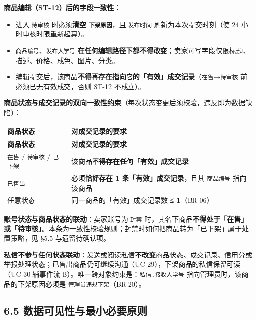 \documentclass[12pt,a4paper]{ctexart}
\begin{document}
\textbf{商品编辑（ST-12）后的字段一致性}：

\begin{itemize}[leftmargin=1.6em,itemsep=1pt,topsep=2pt]
\item 进入 \texttt{待审核} 时必须\textbf{清空 \texttt{下架原因}}，且 \texttt{发布时间} 刷新为本次提交时刻（使 24 小时审核时限重新起算）。
\item \texttt{商品编号}、\texttt{发布人学号} \textbf{在任何编辑路径下都不得改变}；卖家可写字段仅限标题、描述、价格、成色、图片、分类。
\item 编辑提交后，该商品\textbf{不得再存在指向它的「有效」成交记录}（\texttt{在售}→\texttt{待审核} 前必须已无有效成交，否则 ST-12 不成立）。
\end{itemize}

\textbf{商品状态与成交记录的双向一致性约束}（每次状态变更后须校验，违反即为数据缺陷）：


{\footnotesize
\begin{longtable}{|p{2.75cm}|p{13.25cm}|}
\hline
\textbf{商品状态} & \textbf{对成交记录的要求} \\
\hline
\endfirsthead
\hline
\textbf{商品状态} & \textbf{对成交记录的要求} \\
\hline
\endhead
\hline
\endfoot
\texttt{在售} / \texttt{待审核} / \texttt{已下架} & 该商品\textbf{不得存在任何「有效」成交记录} \\
\hline
\texttt{已售出} & 必须\textbf{恰好存在 1 条「有效」成交记录}，且其 \texttt{商品编号} 指向该商品 \\
\hline
任意状态 & 同一商品的「有效」成交记录数 \textbf{≤ 1}（BR-06） \\
\hline
\end{longtable}
}


\textbf{账号状态与商品状态的联动}：卖家账号为 \texttt{封禁} 时，其名下商品\textbf{不得处于「在售」或「待审核」}。本条为一致性校验规则；封禁时如何把商品转为「已下架」属于处置策略，见 §5.5 与遗留待确认项。


\textbf{私信不参与任何状态联动}：发送或阅读私信\textbf{不改变}商品状态、成交记录、信用分或举报处理状态；已售出商品仍可继续沟通（UC-29），下架商品的私信保留可读（UC-30 辅事件流 B）。唯一跨对象约束是：\texttt{私信.接收人学号} 指向管理员时，该商品的下架原因必须是 \texttt{管理员违规下架}（BR-20）。



\subsection*{6.5 数据可见性与最小必要原则}
\end{document}
